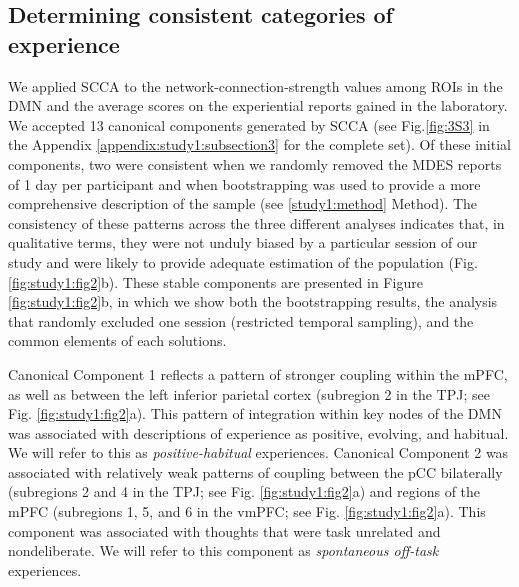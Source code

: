 \subsection{Determining consistent categories of experience}
\label{study1:results:a}
We applied SCCA to the network-connection-strength values among ROIs in the DMN and the average scores on the experiential reports gained in the laboratory. We accepted 13 canonical components generated by SCCA (see Fig.\ref{fig:3S3} in the Appendix \ref{appendix:study1:subsection3} for the complete set). Of these initial components, two were consistent when we randomly removed the MDES reports of 1 day per participant and when bootstrapping was used to provide a more comprehensive description of the sample (see \ref{study1:method} Method). The consistency of these patterns across the three different analyses indicates that, in qualitative terms, they were not unduly biased by a particular session of our study and were likely to provide adequate estimation of the population (Fig. \ref{fig:study1:fig2}b). These stable components are presented in Figure \ref{fig:study1:fig2}b, in which we show both the bootstrapping results, the analysis that randomly excluded one session (restricted temporal sampling), and the common elements of each solutions.

Canonical Component 1 reflects a pattern of stronger coupling within the mPFC, as well as between the left inferior parietal cortex (subregion 2 in the TPJ; see Fig. \ref{fig:study1:fig2}a). This pattern of integration within key nodes of the DMN was associated with descriptions of experience as positive, evolving, and habitual. We will refer to this as \textit{positive-habitual} experiences. Canonical Component 2 was associated with relatively weak patterns of coupling between the pCC bilaterally (subregions 2 and 4 in the TPJ; see Fig. \ref{fig:study1:fig2}a) and regions of the mPFC (subregions 1, 5, and 6 in the vmPFC; see Fig. \ref{fig:study1:fig2}a). This component was associated with thoughts that were task unrelated and nondeliberate. We will refer to this component as \textit{spontaneous off-task} experiences.


